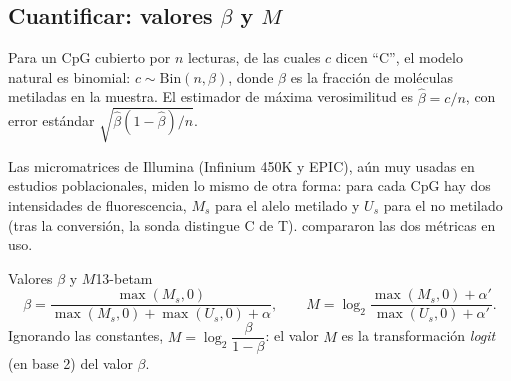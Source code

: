 \subsection{Cuantificar: valores $\beta$ y $M$}

Para un CpG cubierto por $n$ lecturas, de las cuales $c$ dicen ``C'', el modelo natural es binomial: $c\sim\mathrm{Bin}(n,\beta)$, donde $\beta$ es la fracción de moléculas metiladas en la muestra. El estimador de máxima verosimilitud es $\hat\beta=c/n$, con error estándar $\sqrt{\hat\beta(1-\hat\beta)/n}$.

Las micromatrices de Illumina (Infinium 450K y EPIC), aún muy usadas en estudios poblacionales, miden lo mismo de otra forma: para cada CpG hay dos intensidades de fluorescencia, $M_s$ para el alelo metilado y $U_s$ para el no metilado (tras la conversión, la sonda distingue C de T). \textcite{c13-du2010} compararon las dos métricas en uso.

\begin{definicion}{Valores $\beta$ y $M$}{13-betam}
\begin{equation}\label{eq:13-beta}
\beta = \frac{\max(M_s,0)}{\max(M_s,0)+\max(U_s,0)+\alpha},\qquad
M = \log_2\frac{\max(M_s,0)+\alpha'}{\max(U_s,0)+\alpha'} .
\end{equation}
Ignorando las constantes, $M=\log_2\dfrac{\beta}{1-\beta}$: el valor $M$ es la transformación \emph{logit} (en base 2) del valor $\beta$.
\end{definicion}

\begin{simbolos}
\end{simbolos}

